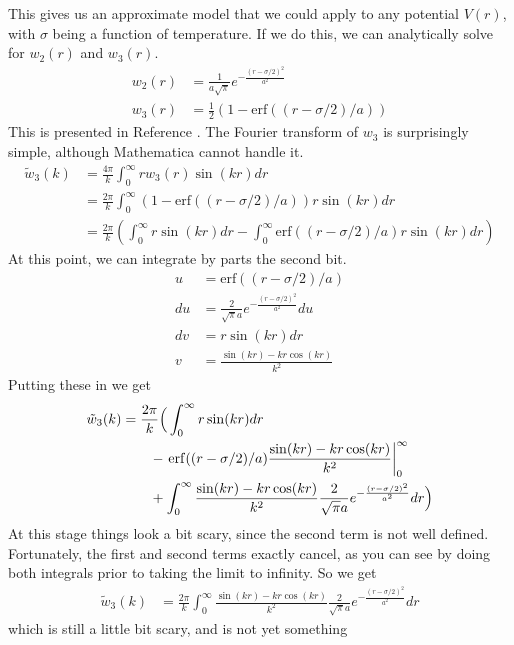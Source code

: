 \documentclass[letterpaper,twocolumn,amsmath,amssymb,prb]{revtex4-1}
\begin{document}
This gives us an approximate model that we could apply to any
potential $V(r)$, with $\sigma$ being a function of temperature.  If
we do this, we can analytically solve for $w_2(r)$ and $w_3(r)$.
\begin{align}
  w_2(r) &= \frac{1}{a\sqrt{\pi}} e^{-\frac{(r-\sigma/2)^2}{a^2}} \\
  w_3(r) &= \tfrac12 ( 1 - \mathrm{erf}((r-\sigma/2)/a) )
\end{align}
This is presented in Reference .  The
Fourier transform of $w_3$ is surprisingly simple, although
Mathematica cannot handle it.
\begin{align}
  \tilde{w}_3(k) &= \frac{4\pi}{k} \int_0^\infty r w_3(r) \sin(kr) dr
  \\
  &=  \frac{2\pi}{k} \int_0^\infty ( 1 -
  \mathrm{erf}((r-\sigma/2)/a) ) r \sin(kr) dr
  \\
  &=  \frac{2\pi}{k} \left(
  \int_0^\infty r \sin(kr) dr
  -
  \int_0^\infty \mathrm{erf}((r-\sigma/2)/a) r \sin(kr) dr
  \right)
\end{align}
At this point, we can integrate by parts the second bit.
\begin{align}
  u &= \mathrm{erf}((r-\sigma/2)/a) \\
  du &= \frac{2}{\sqrt{\pi}a} e^{-\frac{(r-\sigma/2)^2}{a^2}} du \\
  dv &= r \sin(kr) dr \\
  v &= \frac{\sin(kr) - kr \cos(kr)}{k^2}
\end{align}
Putting these in we get
\begin{align} 
 \tilde{w}_3(k)
  &=  \frac{2\pi}{k} \Big( \int_0^\infty r \sin(kr) dr \notag \\ 
 &\quad\quad - \left.\mathrm{erf}((r-\sigma/2)/a)\frac{\sin(kr) - kr
    \cos(kr)}{k^2}\right|_0^\infty \notag \\ &\quad\quad
  +
  \int_0^\infty \frac{\sin(kr) - kr \cos(kr)}{k^2}\frac{2}{\sqrt{\pi}a} e^{-\frac{(r-\sigma/2)^2}{a^2}} dr
  \Big)
\end{align}
At this stage things look a bit scary, since the second term is not
well defined.  Fortunately, the first and second terms exactly cancel,
as you can see by doing both integrals prior to taking the limit to
infinity.  So we get
\begin{align}
  \tilde{w}_3(k)
  &=  \frac{2\pi}{k}\int_0^\infty \frac{\sin(kr) - kr
    \cos(kr)}{k^2}\frac{2}{\sqrt{\pi}a}
  e^{-\frac{(r-\sigma/2)^2}{a^2}} dr
\end{align}
which is still a little bit scary, and is not yet something
\end{document}
